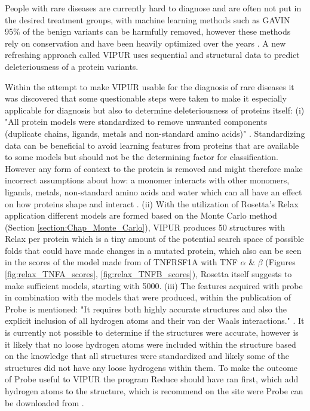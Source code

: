 People with rare diseases are currently hard to diagnose and are often not put in the desired treatment groups, with machine learning methods such as GAVIN 95\% of the benign variants can be harmfully removed, however these methods rely on conservation and have been heavily optimized over the years \cite{van_der_velde_gavin:_2017}.
A new refreshing approach called VIPUR uses sequential and structural data to predict deleteriousness of a protein variants.

Within the attempt to make VIPUR usable for the diagnosis of rare diseases it was discovered that some questionable steps were taken to make it especially applicable for diagnosis but also to determine deleteriousness of proteins itself: (i) "All protein models were standardized to remove unwanted components (duplicate chains, ligands, metals and non-standard amino acids)" \cite{baugh_robust_2016}.
Standardizing data can be beneficial to avoid learning features from proteins that are available to some models but should not be the determining factor for classification. However any form of context to the protein is removed and might therefore make incorrect assumptions about how: a monomer interacts with other monomers, ligands, metals, non-standard amino acids and water which can all have an effect on how proteins shape and interact \cite{koshland_application_1958}.
(ii) With the utilization of Rosetta's Relax application different models are formed based on the Monte Carlo method (Section \ref{section:Chap_Monte_Carlo}), VIPUR produces 50 structures with Relax per protein which is a tiny amount of the potential search space of possible folds that could have made changes in a mutated protein, which also can be seen in the scores of the model made from of TNFRSF1A with TNF $\alpha$ \& $\beta$ (Figures \ref{fig:relax_TNFA_scores}, \ref{fig:relax_TNFB_scores}), Rosetta itself suggests to make sufficient models, starting with 5000\cite{rosetta_commons_analyzing_nodate}.
(iii) The features acquired with probe in combination with the models that were produced, within the publication of Probe is mentioned: "It requires both highly accurate structures and also the explicit inclusion of all hydrogen atoms and their van der Waals interactions." \cite{word_visualizing_1999}.
It is currently not possible to determine if the structures were accurate, however is it likely that no loose hydrogen atoms were included within the structure based on the knowledge that all structures were standardized and likely some of the structures did not have any loose hydrogens within them. To make the outcome of Probe useful to VIPUR the program Reduce should have ran first, which add hydrogen atoms to the structure, which is recommend on the site were Probe can be downloaded from \cite{richardson_lab_probe_nodate}.

